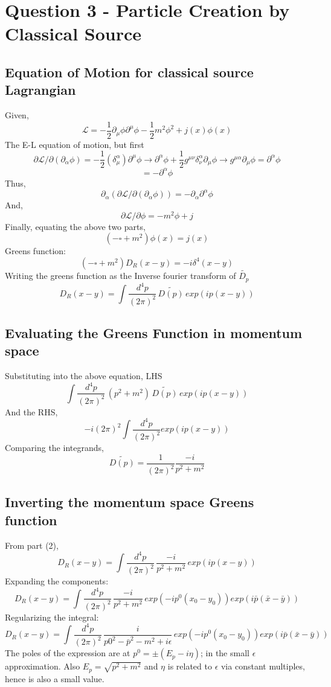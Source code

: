 \documentclass[11pt]{article}
\begin{document}
	\section*{\color{teal}Question 3 - Particle Creation by Classical Source}

	\subsection{Equation of Motion for classical source Lagrangian}
	
	Given,
	\[
		\mathcal{L} = -\frac{1}{2}\partial_\mu \phi \partial^\mu \phi - \frac{1}{2} m^2 \phi^2 + j(x)\phi(x)
	\]
	The E-L equation of motion, but first
	\[
		\partial \mathcal{L}/\partial (\partial_\alpha \phi) = - \frac{1}{2} (\delta^\alpha_\mu)\partial^\mu \phi \rightarrow \partial^\alpha \phi + \frac{1}{2} g^{\mu \nu}\delta_\nu^\alpha \partial_\mu \phi \rightarrow g^{\mu \alpha } \partial_\mu \phi = \partial^\alpha \phi
	\]
	\[
		= -\partial^\alpha \phi
	\]
	Thus,
	\[
		\partial_\alpha( \partial \mathcal{L}/\partial (\partial_\alpha \phi)) =  -\partial_\alpha \partial^\alpha \phi
	\]
	And,
	\[
		\partial \mathcal{L}/\partial \phi = -m^2 \phi  + j 
	\]
	Finally, equating the above two parts,
	\[
		(-\square + m^2)\phi(x) = j(x)
	\]
	Greens function:
	\[
		(-\square + m^2)D_R(x-y) = -i\delta^4(x-y)
	\]
	Writing the greens function as the Inverse fourier transform of $\tilde{D_p}$
	\[
		D_R(x-y) = \int \frac{d^4p}{(2\pi)^2} \, \tilde{D(p)} \, exp(ip(x-y))
	\]
	
	\subsection{Evaluating the Greens Function in momentum space}
	
	Substituting into the above equation, LHS
	\[
		\int \frac{d^4p}{(2\pi)^2} \, (p^2 + m^2) \, \tilde{D(p)} \, exp(ip(x-y))
	\]
	And the RHS,
	\[
		-i(2\pi)^2\int \frac{d^4p}{(2\pi)^2} exp(ip(x-y))
	\]
	Comparing the integrands,
	\[
		\tilde{D(p)} = \frac{1}{(2\pi)^2}\frac{-i}{p^2 + m^2}
	\]
	
	\subsection{Inverting the momentum space Greens function}
	
	From part (2),
	\[
		D_R(x-y) = \int \frac{d^4p}{(2\pi)^2} \, \frac{-i}{p^2 + m^2} \, exp(ip(x-y))
	\]
	Expanding the components:
	\[
		D_R(x-y) = \int \frac{d^4p}{(2\pi)^2} \, \frac{-i}{p^2 + m^2} \, exp(-ip^0(x_0-y_0)) exp(i\bar{p}(\bar{x}-\bar{y}))
	\]
	Regularizing the integral:
	\[
		D_R(x-y) = \int \frac{d^4p}{(2\pi)^2} \, \frac{i}{p0^2 - \bar{p}^2 - m^2 + i\epsilon} \, exp(-ip^0(x_0-y_0)) exp(i\bar{p}(\bar{x}-\bar{y}))
	\]
	The poles of the expression are at $p^0 = \pm (E_p - i\eta)$; in the small $\epsilon$ approximation. Also $E_p = \sqrt{p^2 + m^2}$ and $\eta$ is related to $\epsilon$ via constant multiples, hence is also a small value.\\
	
\end{document}
